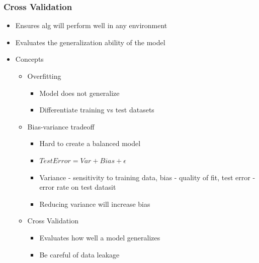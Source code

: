 \documentclass[11pt,xcolor={dvipsnames},usepdftitle=false]{beamer}
\begin{document}
\begin{frame}
  \frametitle{Cross Validation}

  \begin{itemize}
    \small\item Ensures alg will perform well in any environment
    \small\item Evaluates the generalization ability of the model
    \small\item Concepts
      \begin{itemize}
        \footnotesize\item Overfitting
          \begin{itemize}
            \footnotesize\item Model does not generalize
            \footnotesize\item Differentiate training vs test datasets
          \end{itemize}
      \end{itemize}
      \begin{itemize}
        \footnotesize\item Bias-variance tradeoff
          \begin{itemize}
            \footnotesize\item Hard to create a balanced model
            \footnotesize\item $TestError = Var + Bias + \epsilon$
            \footnotesize\item Variance - sensitivity to training data, bias - quality of fit, test error - error rate on test datasit 
            \footnotesize\item Reducing variance will increase bias
          \end{itemize}
      \end{itemize}
      \begin{itemize}
        \footnotesize\item Cross Validation
          \begin{itemize}
            \footnotesize\item Evaluates how well a model generalizes
            \footnotesize\item Be careful of data leakage
          \end{itemize}
      \end{itemize}
  \end{itemize}

\end{frame}
\end{document}
